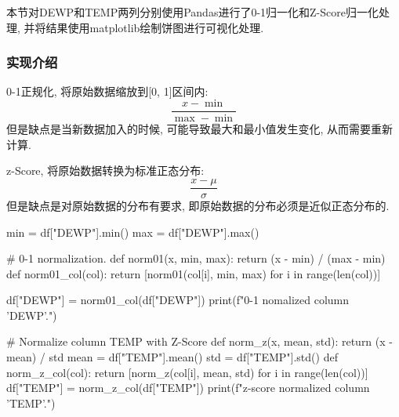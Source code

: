 本节对DEWP和TEMP两列分别使用Pandas进行了0-1归一化和Z-Score归一化处理,
并将结果使用matplotlib绘制饼图进行可视化处理.

\subsubsection{实现介绍}
0-1正规化, 将原始数据缩放到[0, 1]区间内:
\begin{equation}
    \frac{x-\min}{\max - \min}
\end{equation}
但是缺点是当新数据加入的时候, 可能导致最大和最小值发生变化, 从而需要重新计算.

z-Score, 将原始数据转换为标准正态分布:
\begin{equation}
    \frac{x-\mu}{\sigma}
\end{equation}
但是缺点是对原始数据的分布有要求, 即原始数据的分布必须是近似正态分布的.

\begin{python}
    min = df["DEWP"].min()
    max = df["DEWP"].max()

    # 0-1 normalization.
    def norm01(x, min, max): return (x - min) / (max - min)
    def norm01_col(col): return [norm01(col[i], min, max) for i in
                                 range(len(col))]

    df["DEWP"] = norm01_col(df["DEWP"])
    print(f"0-1 nomalized column 'DEWP'.")

    # Normalize column TEMP with Z-Score
    def norm_z(x, mean, std): return (x - mean) / std
    mean = df["TEMP"].mean()
    std = df["TEMP"].std()
    def norm_z_col(col): return [norm_z(col[i], mean, std) for i in
                                 range(len(col))]
    df["TEMP"] = norm_z_col(df["TEMP"])
    print(f"z-score normalized column 'TEMP'.") 
\end{python}

